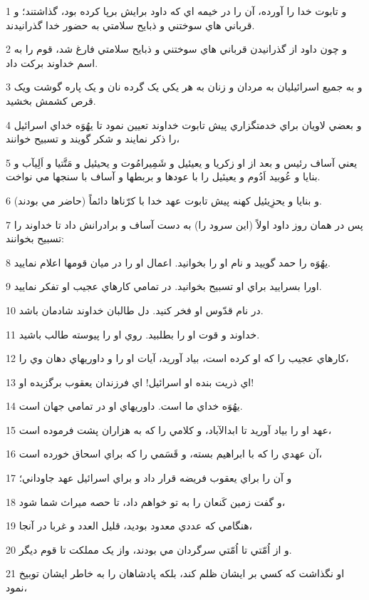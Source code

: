 \par 1 و تابوت خدا را آورده، آن را در خيمه اي که داود برايش برپا کرده بود، گذاشتند؛ و قرباني هاي سوختني و ذبايح سلامتي به حضور خدا گذرانيدند.
\par 2 و چون داود از گذرانيدن قرباني هاي سوختني و ذبايح سلامتي فارغ شد، قوم را به اسم خداوند برکت داد.
\par 3 و به جميع اسرائيليان به مردان و زنان به هر يکي يک گرده نان و يک پاره گوشت ويک قرص کشمش بخشيد.
\par 4 و بعضي لاويان براي خدمتگزاري پيش تابوت خداوند تعيين نمود تا يهُوَه خداي اسرائيل را ذکر نمايند و شکر گويند و تسبيح خوانند،
\par 5 يعني آساف رئيس و بعد از او زکريا و يعيئيل و شَمِيرامُوت و يحيئيل و مَتَّتيا و اَلِيآب و بنايا و عُوبيد اَدُوم و يعيئيل را با عودها و بربطها و آساف با سنجها مي نواخت.
\par 6 و بنايا و يحزِيئيل کهنه پيش تابوت عهد خدا با کرّناها دائماً (حاضر مي بودند).
\par 7 پس در همان روز داود اولاً (اين سرود را) به دست آساف و برادرانش داد تا خداوند را تسبيح بخوانند:
\par 8 يهُوَه را حمد گوييد و نام او را بخوانيد. اعمال او را در ميان قومها اعلام نماييد.
\par 9 اورا بسراييد براي او تسبيح بخوانيد. در تمامي کارهاي عجيب او تفکر نماييد.
\par 10 در نام قدّوس او فخر کنيد. دل طالبان خداوند شادمان باشد.
\par 11 خداوند و قوت او را بطلبيد. روي او را پيوسته طالب باشيد.
\par 12 کارهاي عجيب را که او کرده است، بياد آوريد، آيات او را و داوريهاي دهان وي را،
\par 13 اي ذريت بنده او اسرائيل! اي فرزندان يعقوب برگزيده او!
\par 14 يهُوَه خداي ما است. داوريهاي او در تمامي جهان است.
\par 15 عهد او را بياد آوريد تا ابدالآباد، و کلامي را که به هزاران پشت فرموده است،
\par 16 آن عهدي را که با ابراهيم بسته، و قَسَمي را که براي اسحاق خورده است،
\par 17 و آن را براي يعقوب فريضه قرار داد و براي اسرائيل عهد جاوداني؛
\par 18 و گفت زمين کَنعان را به تو خواهم داد، تا حصه ميراث شما شود،
\par 19 هنگامي که عددي معدود بوديد، قليل العدد و غربا در آنجا،
\par 20 و از اُمّتي تا اُمّتي سرگردان مي بودند، واز يک مملکت تا قوم ديگر.
\par 21 او نگذاشت که کسي بر ايشان ظلم کند، بلکه پادشاهان را به خاطر ايشان توبيخ نمود،
